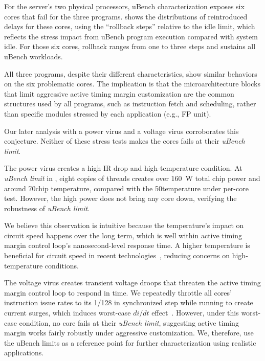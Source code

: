 For the server's two physical processors, uBench characterization exposes six cores that fail for the three programs.  shows the distributions of reintroduced delays for these cores, using the ``rollback steps'' relative to the idle limit, which reflects the stress impact from uBench program execution compared with system idle. For those six cores, rollback ranges from one to three steps and sustains all uBench workloads.

All three programs, despite their different characteristics, show similar behaviors on the six problematic cores. The implication is that the microarchitecture blocks that limit aggressive active timing margin customization are the common structures used by all programs, such as instruction fetch and scheduling, rather than specific modules stressed by each application (e.g., FP unit).

Our later analysis with a power virus and a voltage virus corroborates this conjecture. Neither of these stress tests makes the cores fails at their \textit{uBench limit}.

The power virus creates a high IR drop and high-temperature condition. At \textit{uBench limit} in , eight copies of  threads creates over 160~W total chip power and around 70\C chip temperature, compared with the 50\C temperature under per-core test. However, the high power does not bring any core down, verifying the robustness of \textit{uBench limit}. 

We believe this observation is intuitive because the temperature's impact on circuit speed happens over the long term, which is well within active timing margin control loop's nanosecond-level response time. A higher temperature is beneficial for circuit speed in recent technologies~\cite{zu2016tistate}, reducing concerns on high-temperature conditions.

The voltage virus creates transient voltage droops that threaten the active timing margin control loop to respond in time. We repeatedly throttle all cores' instruction issue rates to its 1/128 in synchronized step while running  to create current surges, which induces worst-case $di/dt$ effect~\cite{lefurgy2011active, lefurgy2013active}. However, under this worst-case condition, no core fails at their \textit{uBench limit}, suggesting active timing margin works fairly robustly under aggressive customization. We, therefore, use the uBench limits as a reference point for further characterization using realistic applications.

